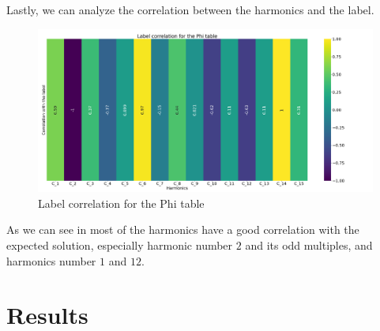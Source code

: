 Lastly, we can analyze the correlation between the harmonics and the label.
\begin{figure}
	\centering
	\includegraphics[scale=.2]{img/Phi_label_corr.png}
	\caption{Label correlation for the Phi table} \label{fig:phi-lcorr}
\end{figure}
As we can see in  most of the harmonics have a good correlation with the
expected solution, especially harmonic number $2$ and its odd multiples, and harmonics number $1$
and $12$.

\section{Results}
